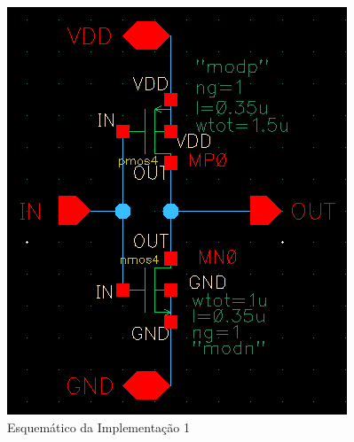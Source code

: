 \documentclass{iiufrgs}
\begin{document}
\begin{figure}[htbp]
    \centering
    \caption{Esquemático da Implementação 1}
    \includegraphics[scale=0.8]{images/esquematico1.png}

    \label{fig:esquematico1}
\end{figure}
\end{document}
